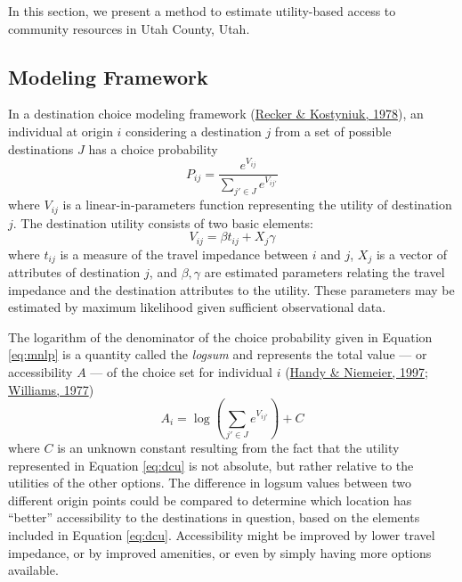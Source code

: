 \documentclass[review, 3p]{elsarticle} %
\begin{document}
In this section, we present a method to estimate utility-based access to
community resources in Utah County, Utah.

\hypertarget{framework}{%
\subsection{Modeling Framework}\label{framework}}

In a destination choice modeling framework (\protect\hyperlink{ref-recker1978}{Recker \& Kostyniuk, 1978}), an individual
at origin \(i\) considering a destination \(j\) from a set of possible destinations
\(J\) has a choice probability
\begin{equation}
P_{ij} = \frac{e^{V_{ij}}}{\sum_{j' \in J} e^{V_{ij'}}}
  \label{eq:mnlp}
\end{equation}
where \(V_{ij}\) is a linear-in-parameters function representing the utility of
destination \(j\). The destination utility consists of two basic elements:
\begin{equation}
 V_{ij} = \beta t_{ij} + X_j\gamma 
  \label{eq:dcu}
\end{equation}
where \(t_{ij}\) is a measure of the travel impedance between \(i\) and \(j\), \(X_j\)
is a vector of attributes of destination \(j\), and \(\beta, \gamma\) are estimated
parameters relating the travel impedance and the destination attributes to the
utility. These parameters may be estimated by maximum likelihood given sufficient
observational data.

The logarithm of the denominator of the choice probability given in Equation
\eqref{eq:mnlp} is a quantity called the \emph{logsum} and represents the total
value --- or accessibility \(A\) --- of the choice set for individual \(i\)
(\protect\hyperlink{ref-handy1997}{Handy \& Niemeier, 1997}; \protect\hyperlink{ref-williams1977formation}{Williams, 1977})
\begin{equation}
 A_i = \log\left(\sum_{j' \in J} e^{V_{ij'}}\right) + C
  \label{eq:dclogsum}
\end{equation}
where \(C\) is an unknown constant resulting from the fact that the utility
represented in Equation \eqref{eq:dcu} is not absolute, but rather relative to
the utilities of the other options. The difference in logsum values between two
different origin points could be compared to determine which location has ``better''
accessibility to the destinations in question, based on the elements included
in Equation \eqref{eq:dcu}. Accessibility might be improved by lower travel
impedance, or by improved amenities, or even by simply having more options available.
\end{document}
